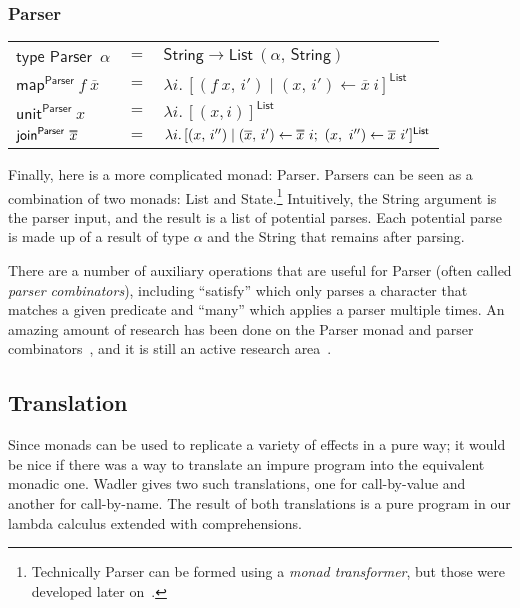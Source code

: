 \documentclass[acmsmall, nonacm, screen]{acmart}
\newcommand\doverline[1]{%
  \setbox0=\hbox{$\overline{#1}$}%
  \ht0=\dimexpr\ht0-.30ex\relax%
  \overline{\copy0}%
}
\newcommand{\lambdaE}[2]{\lambda #1.\, #2}
\newcommand{\map}[3]{\textsf{map}^{\textsf{#1}}~#2~#3}
\newcommand{\unit}[2]{\textsf{unit}^{\textsf{#1}}~#2}
\newcommand{\join}[2]{\textsf{join}^{\textsf{#1}}~#2}
\begin{document}
\subsubsection{Parser}
\begin{center}
  \begin{tabular}{lll}
    $\textsf{type Parser}$~$\alpha$ & $=$ & $\textsf{String} \to \textsf{List}~(\alpha,\, \textsf{String})$ \\
    $\map{Parser}{f}{\overline{x}}$ & $=$ & $\lambdaE{i}{[(f~x,\, i') \mid (x,\, i') \leftarrow \overline{x}~i]^{\textsf{List}}}$ \\
    $\unit{Parser}{x}$ & $=$ & $\lambdaE{i}{[(x, i)]^{\textsf{List}}}$ \\
    $\join{Parser}{\doverline{x}}$ & $=$ & $\lambdaE{i}{[(x,\, i'') \mid (\overline{x},\, i') \leftarrow \doverline{x}~i;\ (x,\ i'') \leftarrow \overline{x}~i']^{\textsf{List}}}$
  \end{tabular}
\end{center}
Finally, here is a more complicated monad: \textsf{Parser}. Parsers can be seen as a combination
of two monads: \textsf{List} and \textsf{State}.\footnote{Technically \textsf{Parser} can be
formed using a {\em monad transformer}, but those were developed later on~\cite{liang1995monad}.}
Intuitively, the \textsf{String} argument is the parser input, and the result is a list of
potential parses. Each potential parse is made up of a result of type $\alpha$ and the
\textsf{String} that remains after parsing.

There are a number of auxiliary operations that are useful for \textsf{Parser} (often called {\em
parser combinators}), including ``\textsf{satisfy}'' which only parses a character that matches a
given predicate and ``\textsf{many}'' which applies a parser multiple times. An amazing amount of
research has been done on the \textsf{Parser} monad and parser
combinators~\cite{hutton1996monadic, leijen2001parsec}, and it is still an active research
area~\cite{willis2020staged}.

\subsection{Translation}
Since monads can be used to replicate a variety of effects in a pure way; it would be nice if
there was a way to translate an impure program into the equivalent monadic one. Wadler gives two
such translations, one for call-by-value and another for call-by-name. The result of both
translations is a pure program in our lambda calculus extended with comprehensions.
\end{document}
